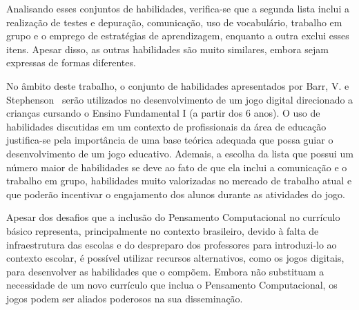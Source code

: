 Analisando esses conjuntos de habilidades, verifica-se que a segunda lista inclui a realização de testes e depuração, comunicação, uso de vocabulário, trabalho em grupo e o emprego de estratégias de aprendizagem, enquanto a outra exclui esses itens. Apesar disso, as outras habilidades são muito similares, embora sejam expressas de formas diferentes.

No âmbito deste trabalho, o conjunto de habilidades apresentados por Barr, V. e Stephenson~\cite{barr_bringing_2011} serão utilizados no desenvolvimento de um jogo digital direcionado a crianças cursando o Ensino Fundamental I (a partir dos 6 anos). O uso de habilidades discutidas em um contexto de profissionais da área de educação justifica-se pela importância de uma base teórica adequada que possa guiar o desenvolvimento de um jogo educativo. Ademais, a escolha da lista que possui um número maior de habilidades se deve ao fato de que ela inclui a comunicação e o trabalho em grupo, habilidades muito valorizadas no mercado de trabalho atual e que poderão incentivar o engajamento dos alunos durante as atividades do jogo. 

Apesar dos desafios que a inclusão do Pensamento Computacional no currículo básico representa, principalmente no contexto brasileiro, devido à falta de infraestrutura das escolas e do despreparo dos professores para introduzi-lo ao contexto escolar, é possível utilizar recursos alternativos, como os jogos digitais, para desenvolver as habilidades que o compõem. Embora não substituam a necessidade de um novo currículo que inclua o Pensamento Computacional, os jogos podem ser aliados poderosos na sua disseminação. 
